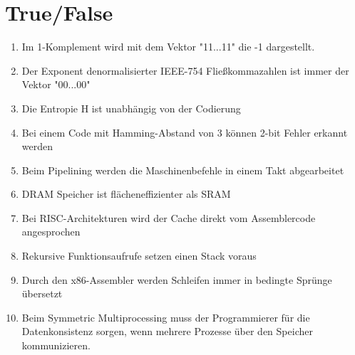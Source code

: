\documentclass{exercisesheet}
\begin{document}
  \section*{True/False}\label{sec:tf}
    \begin{enumerate}
      \item Im 1-Komplement wird mit dem Vektor "11...11" die -1 dargestellt.
      \item Der Exponent denormalisierter IEEE-754 Fließkommazahlen ist immer der Vektor "00...00"
      \item Die Entropie H ist unabhängig von der Codierung
      \item Bei einem Code mit Hamming-Abstand von 3 können 2-bit Fehler erkannt werden
      \item Beim Pipelining werden die Maschinenbefehle in einem Takt abgearbeitet
      \item DRAM Speicher ist flächeneffizienter als SRAM
      \item Bei RISC-Architekturen wird der Cache direkt vom Assemblercode angesprochen
      \item Rekursive Funktionsaufrufe setzen einen Stack voraus
      \item Durch den x86-Assembler werden Schleifen immer in bedingte Sprünge übersetzt
      \item Beim Symmetric Multiprocessing muss der Programmierer für die Datenkonsistenz sorgen, wenn mehrere Prozesse über den Speicher kommunizieren.
    \end{enumerate}
\end{document}
